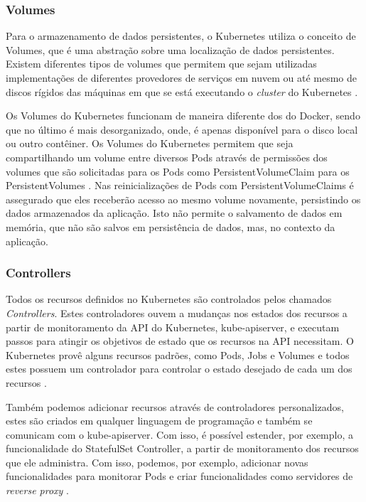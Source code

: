 \subsubsection{Volumes}

Para o armazenamento de dados persistentes, o Kubernetes utiliza o conceito
de Volumes, que é uma abstração sobre uma localização de dados
persistentes. Existem diferentes tipos de volumes que permitem que sejam
utilizadas implementações de diferentes provedores de serviços em nuvem ou
até mesmo de discos rígidos das máquinas em que se está executando o
\textit{cluster} do Kubernetes \cite{kubernetes:volumes}.

Os Volumes do Kubernetes funcionam de maneira diferente dos do
Docker, sendo que no último é mais desorganizado, onde, é apenas disponível para o
disco local ou outro contêiner. Os Volumes do Kubernetes permitem
que seja compartilhando um volume entre diversos Pods através de permissões
dos volumes que são solicitadas para os Pods como PersistentVolumeClaim para os
PersistentVolumes \cite{kubernetes:persistent-volumes}. Nas reinicializações
de Pods com PersistentVolumeClaims é assegurado que eles receberão acesso
ao mesmo volume novamente, persistindo os dados armazenados da aplicação.
Isto não permite o salvamento de dados em memória, que não são salvos em
persistência de dados, mas, no contexto da aplicação.

\subsubsection{Controllers}

Todos os recursos definidos no Kubernetes são controlados pelos chamados
\textit{Controllers}. Estes controladores ouvem a mudanças nos estados dos recursos
a partir de monitoramento da API do Kubernetes, kube-apiserver, e executam passos
para atingir os objetivos de estado que os recursos na API necessitam. O
Kubernetes provê alguns recursos padrões, como Pods, Jobs e Volumes e
todos estes possuem um controlador para controlar o estado desejado de
cada um dos recursos \cite{kubernetes:controllers}.

Também podemos adicionar recursos através de controladores personalizados,
estes são criados em qualquer linguagem de programação e também se comunicam
com o kube-apiserver. Com isso, é possível estender, por exemplo, a
funcionalidade do StatefulSet Controller, a partir de monitoramento dos
recursos que ele administra. Com isso, podemos, por exemplo, adicionar novas
funcionalidades para monitorar Pods e criar funcionalidades como servidores
de \textit{reverse proxy} \cite{kubernetes:controllers}.

